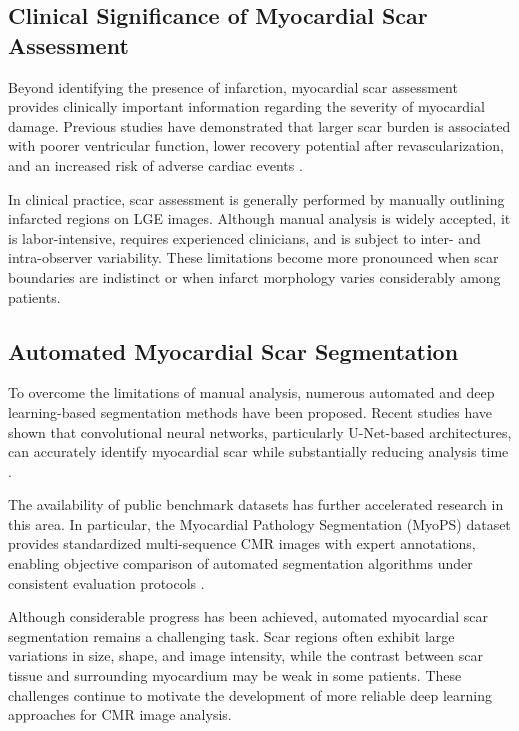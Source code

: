 \subsection{Clinical Significance of Myocardial Scar Assessment}
\label{subsec:clinical-scar}

Beyond identifying the presence of infarction, myocardial scar assessment provides clinically important information regarding the severity of myocardial damage. Previous studies have demonstrated that larger scar burden is associated with poorer ventricular function, lower recovery potential after revascularization, and an increased risk of adverse cardiac events \citep{Kim2000,Ibanez2018}.

In clinical practice, scar assessment is generally performed by manually outlining infarcted regions on LGE images. Although manual analysis is widely accepted, it is labor-intensive, requires experienced clinicians, and is subject to inter- and intra-observer variability. These limitations become more pronounced when scar boundaries are indistinct or when infarct morphology varies considerably among patients.

\subsection{Automated Myocardial Scar Segmentation}
\label{subsec:auto-scar}

To overcome the limitations of manual analysis, numerous automated and deep learning-based segmentation methods have been proposed. Recent studies have shown that convolutional neural networks, particularly U-Net-based architectures, can accurately identify myocardial scar while substantially reducing analysis time \citep{Oktay2018,Isensee2018}.

The availability of public benchmark datasets has further accelerated research in this area. In particular, the Myocardial Pathology Segmentation (MyoPS) dataset provides standardized multi-sequence CMR images with expert annotations, enabling objective comparison of automated segmentation algorithms under consistent evaluation protocols \citep{Zhuang2019}.

Although considerable progress has been achieved, automated myocardial scar segmentation remains a challenging task. Scar regions often exhibit large variations in size, shape, and image intensity, while the contrast between scar tissue and surrounding myocardium may be weak in some patients. These challenges continue to motivate the development of more reliable deep learning approaches for CMR image analysis.


